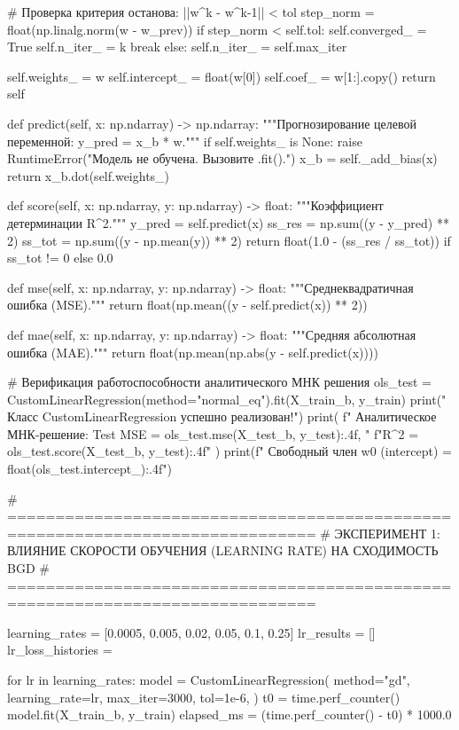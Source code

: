 \documentclass[14pt,a4paper]{extarticle}
\begin{document}
\begin{CodeListing}
            # Проверка критерия останова: ||w^k - w^{k-1}|| < tol
            step_norm = float(np.linalg.norm(w - w_prev))
            if step_norm < self.tol:
                self.converged_ = True
                self.n_iter_ = k
                break
        else:
            self.n_iter_ = self.max_iter

        self.weights_ = w
        self.intercept_ = float(w[0])
        self.coef_ = w[1:].copy()
        return self

    def predict(self, x: np.ndarray) -> np.ndarray:
        """Прогнозирование целевой переменной: y_pred = x_b * w."""
        if self.weights_ is None:
            raise RuntimeError("Модель не обучена. Вызовите .fit().")
        x_b = self._add_bias(x)
        return x_b.dot(self.weights_)

    def score(self, x: np.ndarray, y: np.ndarray) -> float:
        """Коэффициент детерминации R^2."""
        y_pred = self.predict(x)
        ss_res = np.sum((y - y_pred) ** 2)
        ss_tot = np.sum((y - np.mean(y)) ** 2)
        return float(1.0 - (ss_res / ss_tot)) if ss_tot != 0 else 0.0

    def mse(self, x: np.ndarray, y: np.ndarray) -> float:
        """Среднеквадратичная ошибка (MSE)."""
        return float(np.mean((y - self.predict(x)) ** 2))

    def mae(self, x: np.ndarray, y: np.ndarray) -> float:
        """Средняя абсолютная ошибка (MAE)."""
        return float(np.mean(np.abs(y - self.predict(x))))


# Верификация работоспособности аналитического МНК решения
ols_test = CustomLinearRegression(method="normal_eq").fit(X_train_b, y_train)
print(" Класс CustomLinearRegression успешно реализован!")
print(
    f" Аналитическое МНК-решение: Test MSE = {ols_test.mse(X_test_b, y_test):.4f}, "
    f"R^2 = {ols_test.score(X_test_b, y_test):.4f}"
)
print(f" Свободный член w0 (intercept) = {float(ols_test.intercept_):.4f}")

# ==============================================================================
# ЭКСПЕРИМЕНТ 1: ВЛИЯНИЕ СКОРОСТИ ОБУЧЕНИЯ (LEARNING RATE) НА СХОДИМОСТЬ BGD
# ==============================================================================

learning_rates = [0.0005, 0.005, 0.02, 0.05, 0.1, 0.25]
lr_results = []
lr_loss_histories = {}

for lr in learning_rates:
    model = CustomLinearRegression(
        method="gd",
        learning_rate=lr,
        max_iter=3000,
        tol=1e-6,
    )
    t0 = time.perf_counter()
    model.fit(X_train_b, y_train)
    elapsed_ms = (time.perf_counter() - t0) * 1000.0


\end{CodeListing}
\end{document}
